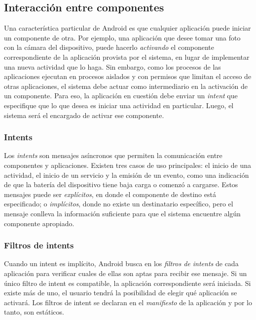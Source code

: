 \subsection{Interacción entre componentes}
Una característica particular de Android es que cualquier aplicación puede iniciar un componente de
otra. Por ejemplo, una aplicación que desee tomar una foto con la cámara del dispositivo, puede
hacerlo \textit{activando} el componente correspondiente de la aplicación provista por el sistema,
en lugar de implementar una nueva actividad que lo haga. Sin embargo, como los procesos de las
aplicaciones ejecutan en procesos aislados y con permisos que limitan el acceso de otras
aplicaciones, el sistema debe actuar como intermediario en la activación de un componente. Para eso,
la aplicación en cuestión debe enviar un \textit{intent} que especifique que lo que desea es iniciar
una actividad en particular. Luego, el sistema será el encargado de activar ese componente.

\subsubsection*{Intents}
Los \textit{intents} son mensajes asíncronos que permiten la comunicación entre componentes y
aplicaciones. Existen tres casos de uso principales: el inicio de una actividad, el inicio de un
servicio y la emisión de un evento, como una indicación de que la batería del dispositivo tiene baja
carga o comenzó a cargarse. Estos mensajes puede ser \textit{explícitos}, en donde el componente de
destino está especificado; o \textit{implícitos}, donde no existe un destinatario específico, pero
el mensaje conlleva la información suficiente para que el sistema encuentre algún componente
apropiado.

\subsubsection*{Filtros de intents}
\label{section:preliminary:intent-filter}
Cuando un intent es implícito, Android busca en los \textit{filtros de intents} de cada aplicación
para verificar cuales de ellas son aptas para recibir ese mensaje. Si un único filtro de intent es
compatible, la aplicación correspondiente será iniciada. Si existe más de uno, el usuario tendrá la
posibilidad de elegir qué aplicación se activará. Los filtros de intent se declaran en el
\textit{manifiesto} de la aplicación y por lo tanto, son estáticos.

